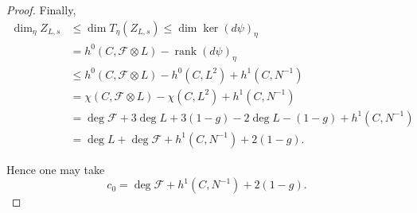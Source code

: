 \documentclass[11pt,letterpaper]{amsart}
\begin{document}
\begin{proof}
Finally,
\begin{align*}
\dim_{\eta} Z_{L,s}
&\le
\dim T_\eta(Z_{L,s})
\le \dim\ker\!\left(d\psi\right)_\eta\\
&= h^0(C,\mathcal{F}\otimes L)-\operatorname{rank}(d\psi)_\eta\\
&\le
h^0(C,\mathcal{F}\otimes L)
-
h^0(C,L^2)+h^1(C,N^{-1})\\
&=
\chi(C,\mathcal{F}\otimes L)
-
\chi(C,L^2)
+
h^1(C,N^{-1})\\
&=
\deg\mathcal{F}
+3\deg L
+3(1-g)
-
2\deg L
-(1-g)
+
h^1(C,N^{-1})\\
&=
\deg L
+\deg\mathcal{F}
+h^1(C,N^{-1})
+2(1-g).
\end{align*}

Hence one may take
\[
c_0
=
\deg\mathcal{F}
+h^1(C,N^{-1})
+2(1-g).
\]
\end{proof}
\end{document}
